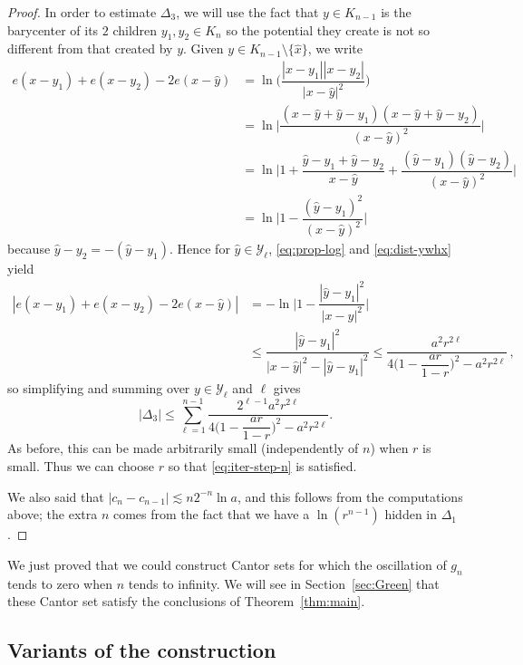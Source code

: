 \documentclass[JEP,XML,SOM,Unicode,published]{cedram}
\let\backslash\setminus
\let\wh\widehat
\numberwithin{equation}{section}
\theoremstyle{plain}
\theoremstyle{definition}
\newcommand{\cY}{{\mathcal Y}}
\begin{document}
\begin{proof}
In order to estimate $\Delta_3$, we will use the fact that $y\in K_{n-1}$ is the barycenter of its $2$
children $y_1,y_2\in K_n$ so the potential they create is not so different from that created by $y$.
Given $y\in K_{n-1}\backslash \{ \wh x\}$, we write\vspace*{-3pt}
\begin{align*}
e(x-y_1) + e(x-y_2) - 2e(x - \wh y)
&= \ln \Big ( \dfrac{|x-y_1||x-y_2|}{|x-\wh y|^2}\Big)
\\
&= \ln \Big | \dfrac{(x-\wh y + \wh y - y_1)(x-\wh y + \wh y - y_2)}{(x-\wh y)^2} \Big |\\
&= \ln \Big | 1 + \dfrac{ \wh y - y_1 + \wh y-y_2}{x-\wh y} + \dfrac{(\wh y - y_1)(\wh y-y_2)}{(x-\wh y)^2}\Big |\\
&= \ln \Big | 1 - \dfrac{(\wh y - y_1)^2}{(x-\wh y)^2}\Big |
\end{align*}
because $\wh y - y_2 = - (\wh y - y_1)$.
Hence for $\wh y\in \cY_\ell$, \eqref{eq:prop-log} and \eqref{eq:dist-ywhx} yield\vspace*{-3pt}
\begin{align*}
|e(x-y_1) + e(x-y_2) - 2e(x - \wh y)| &=-\ln\Big | 1 - \dfrac{|\wh y-y_1|^2}{|x- \wh y|^2}\Big|\\
&\le \dfrac{|\wh y-y_1|^2}{|x- \wh y|^2-|\wh y-y_1|^2}
\le \dfrac{ a^2r^{2 \ell}}{4\Big ( 1 - \dfrac{ar}{1-r}\Big )^2-a^2r^{2 \ell}} \, ,
\end{align*}
so simplifying and summing over $y\in \cY_\ell$ and $\ell$ gives\vspace*{-3pt}
\begin{equation}\label{eq:delta3-bound}
|\Delta_3| \le \sum_{\ell=1}^{n-1} \dfrac{2^{\ell-1} a^2 r^{2\ell}}{4\Big ( 1 - \dfrac{ar}{1-r}\Big )^2-a^2r^{2 \ell}}.
\end{equation}
As before, this can be made arbitrarily small (independently of $n$) when $r$ is small.
Thus we can choose $r$ so that \eqref{eq:iter-step-n} is satisfied.

We also said that $|c_n-c_{n-1}| \lesssim n 2^{-n}\ln a$, and this follows from the computations above; the extra
$n$ comes from the fact that we have a $\ln(r^{n-1})$ hidden in $\Delta_1$.
\end{proof}

We just proved that we could construct Cantor sets for which the oscillation of $g_n$ tends to zero when $n$ tends to infinity.
We will see in Section~\ref{sec:Green} that these Cantor set satisfy the conclusions of Theorem~\ref{thm:main}.

\subsection{Variants of the construction}
\label{sec:Npieces}
\end{document}

